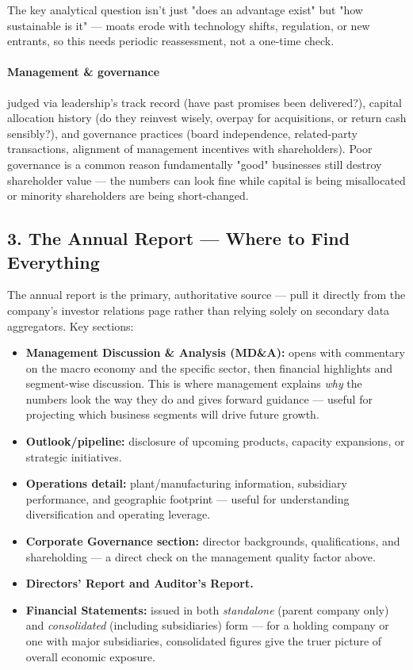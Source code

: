 \documentclass[12pt,openany]{book}
\begin{document}
The key analytical question isn't just "does an advantage exist" but "how sustainable is it" --- moats erode with technology shifts, regulation, or new entrants, so this needs periodic reassessment, not a one-time check.

\paragraph{Management \& governance} judged via leadership's track record (have past promises been delivered?), capital allocation history (do they reinvest wisely, overpay for acquisitions, or return cash sensibly?), and governance practices (board independence, related-party transactions, alignment of management incentives with shareholders). Poor governance is a common reason fundamentally "good" businesses still destroy shareholder value --- the numbers can look fine while capital is being misallocated or minority shareholders are being short-changed.

\subsection{3. The Annual Report --- Where to Find Everything}

The annual report is the primary, authoritative source --- pull it directly from the company's investor relations page rather than relying solely on secondary data aggregators. Key sections:

\begin{itemize}[leftmargin=*]
    \item \textbf{Management Discussion \& Analysis (MD\&A):} opens with commentary on the macro economy and the specific sector, then financial highlights and segment-wise discussion. This is where management explains \emph{why} the numbers look the way they do and gives forward guidance --- useful for projecting which business segments will drive future growth.
    \item \textbf{Outlook/pipeline:} disclosure of upcoming products, capacity expansions, or strategic initiatives.
    \item \textbf{Operations detail:} plant/manufacturing information, subsidiary performance, and geographic footprint --- useful for understanding diversification and operating leverage.
    \item \textbf{Corporate Governance section:} director backgrounds, qualifications, and shareholding --- a direct check on the management quality factor above.
    \item \textbf{Directors' Report and Auditor's Report.}
    \item \textbf{Financial Statements:} issued in both \emph{standalone} (parent company only) and \emph{consolidated} (including subsidiaries) form --- for a holding company or one with major subsidiaries, consolidated figures give the truer picture of overall economic exposure.
\end{itemize}
\end{document}
